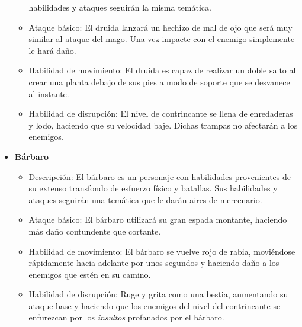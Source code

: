 \begin{itemize}
\begin{itemize}
        habilidades y ataques seguirán la misma temática.
        \item Ataque básico: El druida lanzará un hechizo de mal de ojo que será
        muy similar al ataque del mago. Una vez impacte con el enemigo
        simplemente le hará daño.
        \item Habilidad de movimiento: El druida es capaz de realizar un doble
        salto al crear una planta debajo de sus pies a modo de soporte que se
        desvanece al instante.
        \item Habilidad de disrupción: El nivel de contrincante se llena de
        enredaderas y lodo, haciendo que su velocidad baje. Dichas trampas no
        afectarán a los enemigos.
    \end{itemize}
    \item \textbf{Bárbaro}  %
    \begin{itemize}
        \item Descripción: El bárbaro es un personaje con habilidades
        provenientes de su extenso transfondo de esfuerzo físico y batallas. Sus
        habilidades y ataques seguirán una temática que le darán aires de
        mercenario.
        \item Ataque básico: El bárbaro utilizará su gran espada montante,
        haciendo más daño contundente que cortante.
        \item Habilidad de movimiento: El bárbaro se vuelve rojo de rabia,
        moviéndose rápidamente hacia adelante por unos segundos y haciendo daño
        a los enemigos que estén en su camino.
        \item Habilidad de disrupción: Ruge y grita como una bestia, aumentando
        su ataque base y haciendo que los enemigos del nivel del contrincante se
        enfurezcan por los \textit{insultos} profanados por el bárbaro.
    \end{itemize}
\end{itemize}